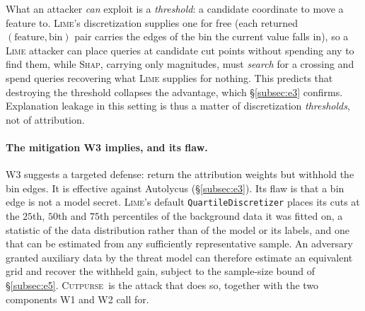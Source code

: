 \documentclass[sigconf,anonymous,review]{acmart}
\newcommand{\sys}{\textsc{Cutpurse}}
\begin{document}
What an attacker \emph{can} exploit is a \emph{threshold}: a candidate coordinate to move a feature
to. \textsc{Lime}'s discretization supplies one for free (each returned $(\text{feature}, \text{bin})$ pair carries the edges of the bin the current value falls in), so a \textsc{Lime} attacker
can place queries at candidate cut points without spending any to find them, while \textsc{Shap},
carrying only magnitudes, must \emph{search} for a crossing and spend queries recovering what
\textsc{Lime} supplies for nothing. This
predicts that destroying the threshold collapses the advantage, which \S\ref{subsec:e3} confirms.
Explanation leakage in this setting is thus a matter of discretization \emph{thresholds}, not of attribution.

\paragraph{The mitigation W3 implies, and its flaw.}
W3 suggests a targeted defense: return the attribution weights but withhold the bin edges. It is
effective against Autolycus (\S\ref{subsec:e3}). Its flaw is that a bin edge is not a model secret.
\textsc{Lime}'s default \texttt{QuartileDiscretizer} places its cuts at the $25$th, $50$th and $75$th
percentiles of the background data it was fitted on, a statistic of the data distribution rather than
of the model or its labels, and one that can be estimated from any sufficiently representative sample.
An adversary granted auxiliary data by the threat model can therefore estimate an equivalent grid and
recover the withheld gain, subject to the sample-size bound of \S\ref{subsec:e5}. \sys\ is the attack that does so, together with the two components
W1 and W2 call for.

\end{document}
